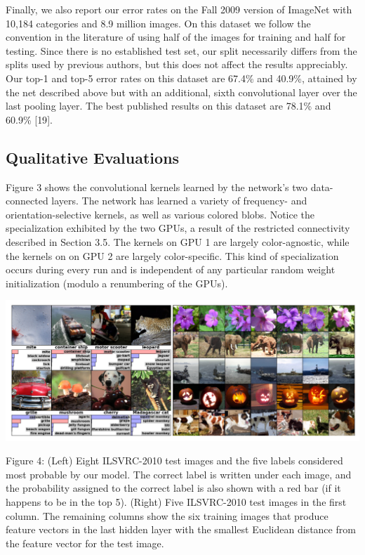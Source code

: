\documentclass[12pt,a4paper,UTF8,twoside]{book}
\begin{document}
Finally, we also report our error rates on the Fall 2009 version of ImageNet with 10,184 categories and 8.9 million images. On this dataset we follow the convention in the literature of using half of the images for training and half for testing. Since there is no established test set, our split necessarily differs from the splits used by previous authors, but this does not affect the results appreciably. Our top-1 and top-5 error rates on this dataset are 67.4\% and 40.9\%, attained by the net described above but with an additional, sixth convolutional layer over the last pooling layer. The best published results on this dataset are 78.1\% and 60.9\% {[}19{]}.

\hypertarget{qualitative-evaluations}{%
\subsection{Qualitative Evaluations}\label{qualitative-evaluations}}

Figure 3 shows the convolutional kernels learned by the network's two data-connected layers. The network has learned a variety of frequency- and orientation-selective kernels, as well as various colored blobs. Notice the specialization exhibited by the two GPUs, a result of the restricted connectivity described in Section 3.5. The kernels on GPU 1 are largely color-agnostic, while the kernels on on GPU 2 are largely color-specific. This kind of specialization occurs during every run and is independent of any particular random weight initialization (modulo a renumbering of the GPUs).

\begin{center}\includegraphics[width=0.7\linewidth]{img/01-04} \end{center}

Figure 4: (Left) Eight ILSVRC-2010 test images and the five labels considered most probable by our model. The correct label is written under each image, and the probability assigned to the correct label is also shown with a red bar (if it happens to be in the top 5). (Right) Five ILSVRC-2010 test images in the first column. The remaining columns show the six training images that produce feature vectors in the last hidden layer with the smallest Euclidean distance from the feature vector for the test image.
\end{document}
